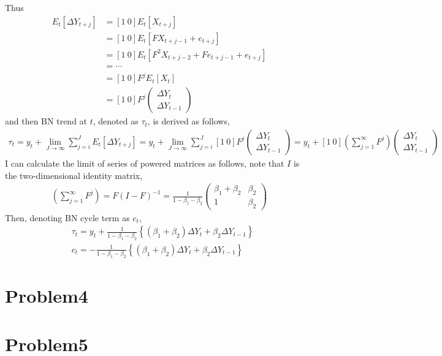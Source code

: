\documentclass{article}
\begin{document}
 Thus
\begin{align*}
	E_t \left[\Delta Y_{t+j}\right] &= [1\ 0 ]E_t \left[X_{t+j}\right]\\
	&= [1\ 0] E_t \left[ F X_{t+j-1} + e_{t+j} \right]\\
	&= [1\ 0] E_t \left[ F^2 X_{t+j-2} + F e_{t+j-1} + e_{t+j}\right]\\
	&= \cdots\\
	&= [1\ 0] F^j E_t \left[ X_t \right]\\
	&= [1\ 0] F^j \begin{pmatrix} \Delta Y_t\\ \Delta Y_{t-1} \end{pmatrix}
\end{align*}
and then BN trend at $t$, denoted as $\tau_t$, is derived as follows,
\begin{align*}
	\tau_t = y_t + \lim_{J \to \infty} \sum_{j = i}^J E_t\left[ \Delta Y_{t+j} \right] = y_t +  \lim_{J \to \infty} \sum_{j = i}^J [1\ 0] F^j \begin{pmatrix} \Delta Y_t\\ \Delta Y_{t-1} \end{pmatrix} = y_t + [1\ 0] \left( \sum_{j=1}^{\infty} F^j \right) \begin{pmatrix} \Delta Y_t\\ \Delta Y_{t-1} \end{pmatrix}
\end{align*}
I can calculate the limit of series of powered matrices as follows, note that $I$ is the two-dimensional identity matrix,
\begin{align*}
	 \left( \sum_{j=1}^{\infty} F^j \right) = F \left( I - F\right)^{-1} = \frac{1}{1-\beta_1 -\beta_2} \begin{pmatrix} \beta_1 + \beta_2 & \beta_2\\ 1 & \beta_2 \end{pmatrix}
\end{align*}
Then, denoting BN cycle term as $c_t$,  
\begin{align*}
	&\tau_t = y_t + \frac{1}{1-\beta_1 -\beta_2} \left\{ (\beta_1 + \beta_2)\Delta Y_t + \beta_2 \Delta Y_{t-1} \right\}\\
	&c_t = - \frac{1}{1-\beta_1 -\beta_2} \left\{ (\beta_1 + \beta_2)\Delta Y_t + \beta_2 \Delta Y_{t-1} \right\}
\end{align*}


\section{Problem4}

\section{Problem5}
\end{document}
